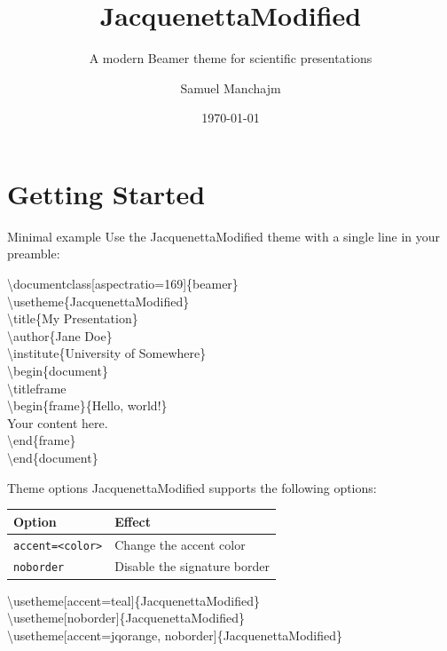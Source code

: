 \documentclass[aspectratio=169]{beamer}
\title{JacquenettaModified}
\subtitle{A modern Beamer theme for scientific presentations}
\author{Samuel Manchajm}
\institute{GitHub --- JacquenettaModified-beamer-theme}
\date{\today}
\begin{document}
\titleframe

\section{Getting Started}

\begin{frame}{Minimal example}
    Use the JacquenettaModified theme with a single line in your preamble:

    \vspace{0.1cm}
    {\small\ttfamily
    \textbackslash documentclass[aspectratio=169]\{beamer\}\\
    \textbackslash usetheme\{JacquenettaModified\}\\[2pt]
    \textbackslash title\{My Presentation\}\\
    \textbackslash author\{Jane Doe\}\\
    \textbackslash institute\{University of Somewhere\}\\[2pt]
    \textbackslash begin\{document\}\\
    \quad\textbackslash titleframe\\
    \quad\textbackslash begin\{frame\}\{Hello, world!\}\\
    \quad\quad Your content here.\\
    \quad\textbackslash end\{frame\}\\
    \textbackslash end\{document\}
    }
\end{frame}

\begin{frame}{Theme options}
    \vspace{-0.7cm}
    JacquenettaModified supports the following options:
    \vspace{0.3cm}
    \begin{tabular}{ll}
        \toprule
        \textbf{Option} & \textbf{Effect} \\
        \midrule
        \texttt{accent=<color>} & Change the accent color \\
        \texttt{noborder}       & Disable the signature border \\
        \bottomrule
    \end{tabular}

    \vspace{0.5cm}
    {\small\ttfamily
    \textbackslash usetheme[accent=teal]\{JacquenettaModified\}\\
    \textbackslash usetheme[noborder]\{JacquenettaModified\}\\
    \textbackslash usetheme[accent=jqorange, noborder]\{JacquenettaModified\}
    }
\end{frame}
\end{document}
